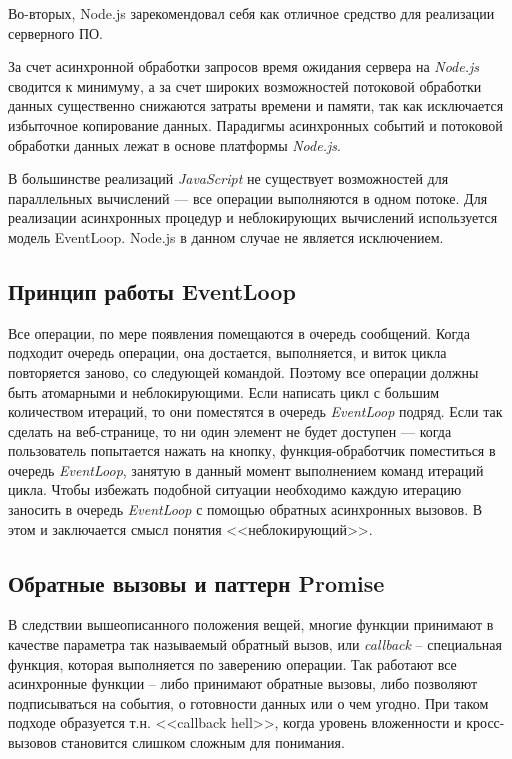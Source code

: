 Во-вторых, Node.js зарекомендовал себя как отличное средство для
реализации серверного ПО.

За счет асинхронной обработки запросов время ожидания сервера на
\textit{Node.js} сводится к минимуму, а за счет широких возможностей потоковой
обработки данных существенно снижаются затраты времени и памяти, так
как исключается избыточное копирование данных. Парадигмы асинхронных
событий и потоковой обработки данных лежат в основе платформы \textit{Node.js}.

В большинстве реализаций \textit{JavaScript} не существует возможностей для
параллельных вычислений --- все операции выполняются в одном
потоке. Для реализации асинхронных процедур и неблокирующих вычислений
используется модель EventLoop. Node.js в данном случае не является
исключением.

\subsection{Принцип работы EventLoop}

Все операции, по мере появления помещаются в очередь сообщений. Когда
подходит очередь операции, она достается, выполняется, и виток цикла
повторяется заново, со следующей командой. Поэтому все операции должны
быть атомарными и неблокирующими. Если написать цикл с большим
количеством итераций, то они поместятся в очередь \textit{EventLoop}
подряд. Если так сделать на веб-странице, то ни один элемент не будет
доступен --- когда пользователь попытается нажать на кнопку,
функция-обработчик поместиться в очередь \textit{EventLoop}, занятую в данный
момент выполнением команд итераций цикла. Чтобы избежать подобной
ситуации необходимо каждую итерацию заносить в очередь \textit{EventLoop} с
помощью обратных асинхронных вызовов. В этом и заключается смысл понятия
<<неблокирующий>>.

\subsection{ Обратные вызовы и паттерн Promise}

В следствии вышеописанного положения вещей, многие функции принимают в
качестве параметра так называемый обратный вызов, или \textit{callback }--
специальная функция, которая выполняется по заверению
операции. Так работают все асинхронные функции -- либо принимают
обратные вызовы, либо позволяют подписываться на события, о готовности данных
или о чем угодно. При таком подходе образуется т.н. <<callback hell>>,
когда уровень вложенности и кросс-вызовов становится слишком сложным
для понимания.

